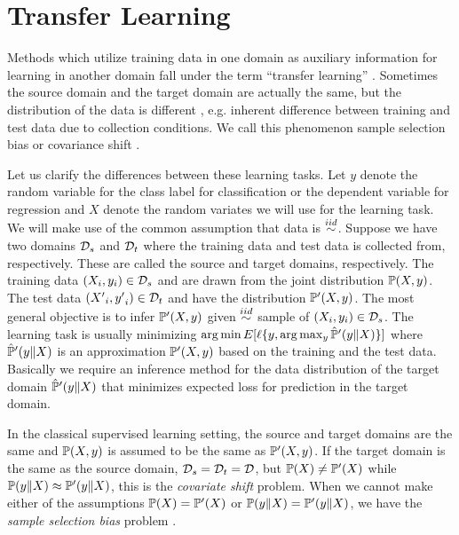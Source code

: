 \documentclass[12pt,oneside,final]{thesis}\usepackage[]{graphicx}\usepackage[]{color}
\begin{document}
\section[Transfer Learning and Domain Adaptation]{Transfer Learning \label{sec:translearn}}

Methods which utilize training data in one domain  as auxiliary information for  learning  in another domain fall under the term ``transfer learning'' \cite{TransLearnSurvey}. Sometimes the source domain and the target domain are actually the same, but the distribution of the data is different , e.g. inherent difference between training and test data due to collection conditions. We call this phenomenon sample selection bias or covariance shift \cite{Zadrozny2004a,TransLearnSurvey}.

Let us clarify the differences between  these learning tasks.  Let $y$ denote the random variable for the class label  for classification or the dependent variable for regression and $X$ denote the random variates we will use for the learning task. We will  make use of  the common assumption that data is $\stackrel{iid}{\sim}$.  
Suppose we have two domains  ${\mathcal{D}}_s$ and ${\mathcal{D}}_t$ where the training data and test data is collected from, respectively. These are called the source and target domains, respectively.
The training data $\left(X_i,y_i\right) \in {\mathcal{D}}_s$ and are drawn from the joint distribution $\mathbb{P}(X,y)$. 
The test data $\left({X'}_i,{y'}_i\right) \in {\mathcal{D}}_t$ and have the distribution $\mathbb{P}'(X,y)$.
The most general objective is to infer $\mathbb{P}'(X,y)$  given $\stackrel{iid}{\sim}$ sample of $\left(X_i,y_i\right) \in {\mathcal{D}}_s$. 
The learning task is usually minimizing  $\arg\min E[\ell\{y, \arg\max_y{\hat{\mathbb{P}}'(y \| X) } \}]$  
where $\hat{\mathbb{P}}'(y \| X)$  is an approximation  $\mathbb{P}'(X,y)$ based on the training and the test data. Basically we require an inference method for the data distribution of the target domain   $\hat{\mathbb{P}}'(y \| X)$ that minimizes expected loss for prediction in the target domain.

In the classical supervised learning setting, the source and target domains are the same and  $\mathbb{P}(X,y)$ is assumed to be the same as $\mathbb{P}'(X,y)$. If the target domain is the same as the source domain, ${\mathcal{D}}_s={\mathcal{D}}_t=\mathcal{D}$, but $\mathbb{P}(X) \neq\mathbb{P}'(X)$ while $\mathbb{P}(y\|X) \approx \mathbb{P}'(y \| X)$, this is the \emph{covariate shift} problem.  When we cannot make either of the assumptions $\mathbb{P}(X) = \mathbb{P}'(X)$ or $\mathbb{P}(y\|X) = \mathbb{P}'(y \| X)$, we have the \emph{sample selection bias} problem \cite{Zadrozny2004a}.
\end{document}
